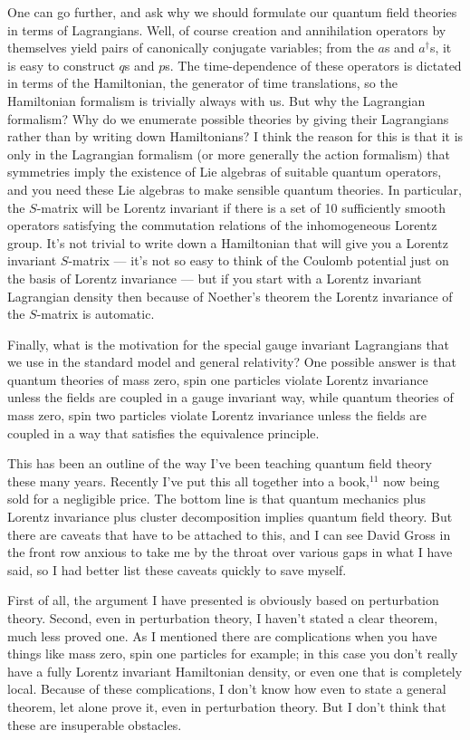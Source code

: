 One can go further, and ask why we should formulate our
quantum field theories in terms of Lagrangians.    Well, of
course creation and annihilation operators by themselves
yield pairs of canonically conjugate  variables; from the
$a$s and $a^\dagger$s, it is easy to  construct $q$s and
$p$s.  The time-dependence of these operators is dictated in
terms of the Hamiltonian, the generator of time
translations, so the Hamiltonian formalism is trivially
always with us.  But why the Lagrangian formalism?  Why do
we enumerate possible theories by giving their Lagrangians
rather than by writing down Hamiltonians?  I think the
reason for this is that it is only in the Lagrangian
formalism (or more generally the action formalism)  that
symmetries imply the existence of Lie algebras of suitable
quantum operators, and you need these Lie algebras to make
sensible quantum theories.  In particular, the $S$-matrix
will be Lorentz invariant if there is a set of 10
sufficiently smooth operators satisfying the commutation
relations of the inhomogeneous Lorentz group.  It's not
trivial to write down a Hamiltonian that will give you a
Lorentz invariant $S$-matrix --- it's not so easy to think
of the Coulomb potential just on the basis of Lorentz
invariance --- but if you start with a Lorentz invariant
Lagrangian density then because of Noether's theorem the
Lorentz invariance of the $S$-matrix is automatic.

Finally, what is the motivation for  the special gauge
invariant Lagrangians that we use in the standard model and
general relativity?  One possible answer is that quantum
theories of  mass zero, spin one particles violate Lorentz
invariance unless the fields are coupled in a gauge
invariant way, while quantum theories of mass zero, spin two
particles violate Lorentz invariance unless the fields are
coupled in a way that satisfies the equivalence principle.

This has been an outline of the way I've been teaching
quantum field theory these many years.  Recently I've put
this all together into a book,$^{11}$ now being sold for a
negligible price.   The bottom line is that
quantum mechanics plus Lorentz invariance plus cluster
decomposition implies quantum field theory.  But there are
caveats that have to be attached to this, and I can see
David Gross in the front row anxious to take me by the
throat over various gaps in what I have said, so I had
better list these caveats quickly to save myself.

First of all, the argument I have presented is obviously
based on perturbation theory.  Second, even in perturbation
theory, I haven't stated a clear theorem, much less proved
one.  As I mentioned there are complications when you have
things like mass zero, spin one particles for example; in
this case you don't really have a fully Lorentz invariant
Hamiltonian density, or even one that is completely local.
Because of these complications, I don't know how even to
state a general theorem, let alone prove it, even in
perturbation theory.  But I don't think that these are
insuperable obstacles.

